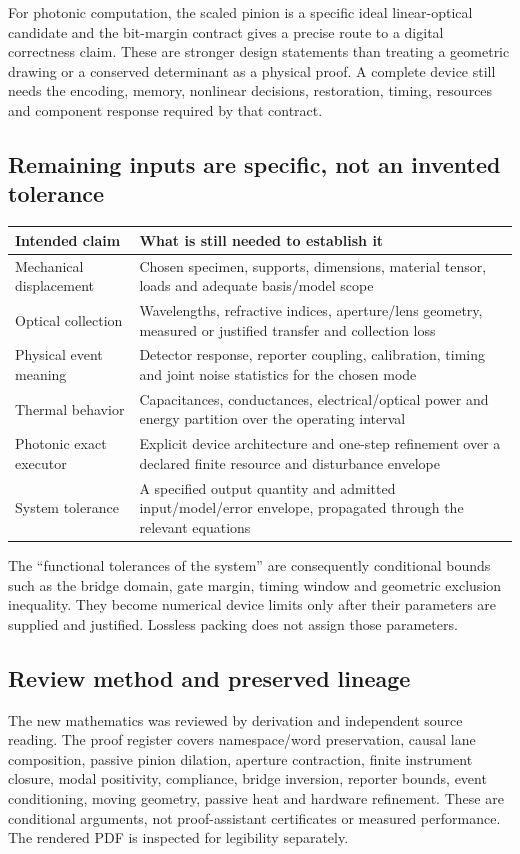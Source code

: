 For photonic computation, the scaled pinion is a specific ideal linear-optical
candidate and the bit-margin contract gives a precise route to a digital
correctness claim. These are stronger design statements than treating a
geometric drawing or a conserved determinant as a physical proof. A complete
device still needs the encoding, memory, nonlinear decisions, restoration,
timing, resources and component response required by that contract.

\subsection{Remaining inputs are specific, not an invented tolerance}
\begin{center}\small
\begin{tabularx}{\linewidth}{@{}P{35mm}Y@{}}
\toprule Intended claim & What is still needed to establish it\\\midrule
Mechanical displacement & Chosen specimen, supports, dimensions, material tensor, loads and adequate basis/model scope\\
Optical collection & Wavelengths, refractive indices, aperture/lens geometry, measured or justified transfer and collection loss\\
Physical event meaning & Detector response, reporter coupling, calibration, timing and joint noise statistics for the chosen mode\\
Thermal behavior & Capacitances, conductances, electrical/optical power and energy partition over the operating interval\\
Photonic exact executor & Explicit device architecture and one-step refinement over a declared finite resource and disturbance envelope\\
System tolerance & A specified output quantity and admitted input/model/error envelope, propagated through the relevant equations\\
\bottomrule
\end{tabularx}\end{center}
The ``functional tolerances of the system'' are consequently conditional bounds
such as the bridge domain, gate margin, timing window and geometric exclusion
inequality. They become numerical device limits only after their parameters
are supplied and justified. Lossless packing does not assign those parameters.

\subsection{Review method and preserved lineage}
The new mathematics was reviewed by derivation and independent source reading.
The proof register covers namespace/word preservation, causal lane composition,
passive pinion dilation, aperture contraction, finite instrument closure,
modal positivity, compliance, bridge inversion, reporter bounds, event
conditioning, moving geometry, passive heat and hardware refinement.
These are conditional arguments, not proof-assistant certificates or measured
performance. The rendered PDF is inspected for legibility separately.

